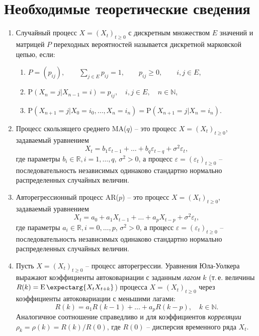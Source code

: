 \documentclass[a4paper,14pt]{extreport}
\renewcommand{\=}[1]{\stackrel{#1}{=}} %
\newcommand{\Expectmore}{\operatorname{E}\expectarg}
\newcommand{\Proba}{\mathrm{P}}
\newcommand{\generaltime}{t \geqslant 0}
\newcommand{\newprocess}[1]{
	\ensuremath{
		#1 = \left(#1 _t\right)_{\generaltime}
	}
}
\newenvironment{boenumerate}
  {\begin{enumerate}\renewcommand\labelenumi{\textbf{\theenumi.}}}
  {\end{enumerate}}
\begin{document}
\newpage

\section*{Необходимые теоретические сведения}

\begin{boenumerate}
\item Случайный процесс $\newprocess{X}$ с дискретным
множеством $E$ значений и матрицей $P$ переходных вероятностей
называется дискретной марковской цепью, если:
	\begin{enumerate}
	\item $P = (p_{ij}), \qquad
	\sum\limits_{j \in E} p_{ij} = 1, \qquad
	p_{ij} \geqslant 0, \qquad i, j \in E$,
	\item $\Proba (X_n = j | X_{n-1} = i) = p_{ij}, \quad i, j \in E, \quad n \in \mathbb{N}$,
	\item $\Proba (X_{n+1} = j | X_0 = i_0, \ldots, X_n = i_n) = 
		\Proba (X_{n+1} = j | X_n = i_n).$
	\end{enumerate}

\item Процесс скользящего среднего MA($q$) -- это процесс $\newprocess{X}$,
задаваемый уравнением
\[
X_t = b_1 \varepsilon_{t-1} + \ldots + b_q \varepsilon_{t-q} + \sigma^2 \varepsilon_t,
\]
где параметры $b_i \in \mathbb{R}, i=1, \ldots, q$, $\sigma^2 > 0$,
а процесс $\newprocess{\varepsilon}$ -- последовательность 
независимых одинаково стандартно нормально распределенных случайных величин.

\item Авторегрессионный процесс AR($p$) -- это процесс $\newprocess{X}$,
задаваемый уравнением
\[
X_t = a_0 + a_1 X_{t-1} + \ldots + a_p X_{t-p} + \sigma^2 \varepsilon_t,
\]
где параметры $a_i \in \mathbb{R}, i=0, \ldots, p$, $\sigma^2 > 0$,
а процесс $\newprocess{\varepsilon}$ -- последовательность 
независимых одинаково стандартно нормально распределенных случайных величин.

\item Пусть $\newprocess{X}$ -- процесс авторегрессии.
Уравнения Юла-Уолкера выражают коэффициенты автоковариации
с заданным {\em лагом} $k$ (т.\,е. величины $R(k) = \Expectmore {X_t X_{t+k}}$)
процесса $\newprocess{X}$ через коэффициенты автоковариации с меньшими лагами:
\[
R(k) = a_1 R(k - 1) + \ldots + a_p R(k - p),
\quad
k \in \mathbb{N}.
\]
Аналогичное соотношение справедливо и для коэффициентов
{\em корреляции} $\rho_k = \rho(k) = R(k) / R(0)$, где $R(0)$ --
дисперсия временного ряда $X_t$.



\end{boenumerate}
\end{document}
